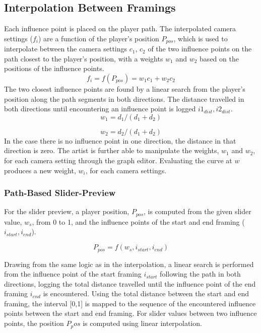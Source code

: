 \subsection{Interpolation Between Framings} \label{interpolationChapter}
Each influence point is placed on the player path. The interpolated camera settings ($f_{i}$) are a function of the player's position $P_{pos}$, which is used to interpolate between the camera settings $c_1$, $c_2$ of the two influence points on the path closest to the player's position, with a weights $w_1$ and $w_2$ based on the positions of the influence points.
\begin{equation}
f_{i} = f(P_{pos}) = w_1c_1+w_2c_2
\end{equation}
The two closest influence points are found by a linear search from the player's position along the path segments in both directions. The distance travelled in both directions until encountering an influence point is logged $i1_{dist}, i2_{dist}$.
\begin{equation}
w_1 = {d_1}/(d_1 + d_2)
\end{equation}

\begin{equation}
w_2 = {d_2}/(d_1 + d_2)
\end{equation}
In the case there is no influence point in one direction, the distance in that direction is zero. The artist is further able to manipulate the weights, $w_1$ and $w_2$, for each camera setting through the graph editor. Evaluating the curve at $w$ produces a new weight, $w_{i}$, for each camera settings.


\subsubsection{Path-Based Slider-Preview}
For the slider preview, a player position, $P_{pos}$, is computed from the given slider value, $w_s$, from 0 to 1, and the influence points of the start and end framing ($i_{start}, i_{end}$).


\begin{equation}
P_{pos} = f(w_s, i_{start}, i_{end})
\end{equation}


Drawing from the same logic as in the interpolation, a linear search is performed from the influence point of the start framing $i_{start}$ following the path in both directions, logging the total distance travelled until the influence point of the end framing $i_{end}$ is encountered. Using the total distance between the start and end framing, the interval [0,1] is mapped to the sequence of the encountered influence points between the start and end framing. For slider values between two influence points, the position $P_pos$ is computed using linear interpolation.


